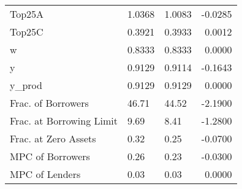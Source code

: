 \begin{table}
\begin{tabular}{lllr}
                  Top25A &  1.0368 &   1.0083 & -0.0285 \\
                  Top25C &  0.3921 &   0.3933 &  0.0012 \\
                       w &  0.8333 &   0.8333 &  0.0000 \\
                       y &  0.9129 &   0.9114 & -0.1643 \\
                  y\_prod &  0.9129 &   0.9129 &  0.0000 \\
      Frac. of Borrowers &   46.71 &    44.52 & -2.1900 \\
Frac. at Borrowing Limit &    9.69 &     8.41 & -1.2800 \\
    Frac. at Zero Assets &    0.32 &     0.25 & -0.0700 \\
        MPC of Borrowers &    0.26 &     0.23 & -0.0300 \\
          MPC of Lenders &    0.03 &     0.03 &  0.0000 \\
\bottomrule
\end{tabular}
\end{table}
